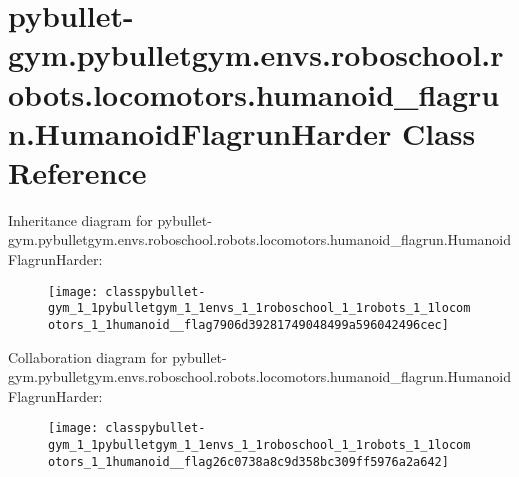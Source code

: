 \hypertarget{classpybullet-gym_1_1pybulletgym_1_1envs_1_1roboschool_1_1robots_1_1locomotors_1_1humanoid__flagrun_1_1_humanoid_flagrun_harder}{}\section{pybullet-\/gym.pybulletgym.\+envs.\+roboschool.\+robots.\+locomotors.\+humanoid\+\_\+flagrun.\+Humanoid\+Flagrun\+Harder Class Reference}
\label{classpybullet-gym_1_1pybulletgym_1_1envs_1_1roboschool_1_1robots_1_1locomotors_1_1humanoid__flagrun_1_1_humanoid_flagrun_harder}


Inheritance diagram for pybullet-\/gym.pybulletgym.\+envs.\+roboschool.\+robots.\+locomotors.\+humanoid\+\_\+flagrun.\+Humanoid\+Flagrun\+Harder\+:
\nopagebreak
\begin{figure}[H]
\begin{center}
\leavevmode
\texttt{[image: classpybullet-gym\_1\_1pybulletgym\_1\_1envs\_1\_1roboschool\_1\_1robots\_1\_1locomotors\_1\_1humanoid\_\_flag7906d39281749048499a596042496cec]}
\end{center}
\end{figure}


Collaboration diagram for pybullet-\/gym.pybulletgym.\+envs.\+roboschool.\+robots.\+locomotors.\+humanoid\+\_\+flagrun.\+Humanoid\+Flagrun\+Harder\+:
\nopagebreak
\begin{figure}[H]
\begin{center}
\leavevmode
\texttt{[image: classpybullet-gym\_1\_1pybulletgym\_1\_1envs\_1\_1roboschool\_1\_1robots\_1\_1locomotors\_1\_1humanoid\_\_flag26c0738a8c9d358bc309ff5976a2a642]}
\end{center}
\end{figure}
